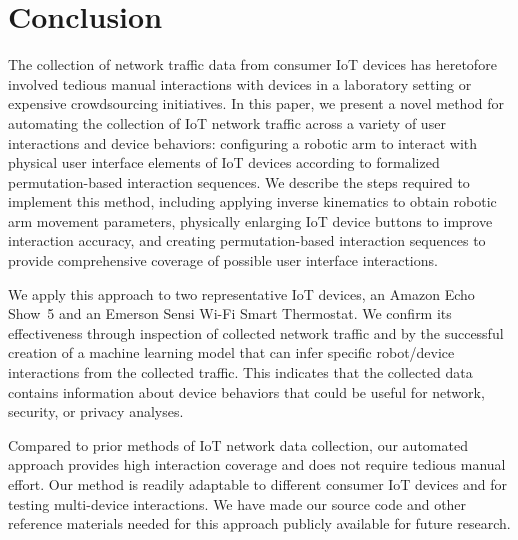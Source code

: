 \section{Conclusion}
\label{sec:conclusion}
The collection of network traffic data from consumer IoT devices has heretofore involved tedious manual interactions with devices in a laboratory setting or expensive crowdsourcing initiatives. In this paper, we present a novel method for automating the collection of IoT network traffic across a variety of user interactions and device behaviors: configuring a robotic arm to interact with physical user interface elements of IoT devices according to formalized permutation-based interaction sequences. 
We describe the steps required to implement this method, including applying inverse kinematics to obtain robotic arm movement parameters, physically enlarging IoT device buttons to improve interaction accuracy, and  
creating permutation-based interaction sequences to provide comprehensive coverage of possible user interface interactions. 

We apply this approach to two representative IoT devices, an Amazon Echo Show~5 and an Emerson Sensi Wi-Fi Smart Thermostat. 
We confirm its effectiveness through inspection of collected network traffic and by the successful creation of a machine learning model that can infer specific robot/device interactions from the collected traffic. 
This indicates that the collected data contains information about device behaviors that could be useful for network, security, or privacy analyses.

Compared to prior methods of IoT network data collection, our automated approach provides high interaction coverage and does not require tedious manual effort. Our method is readily adaptable to different consumer IoT devices and for testing multi-device interactions. 
We have made our source code and other reference materials needed for this approach publicly available for future research.
